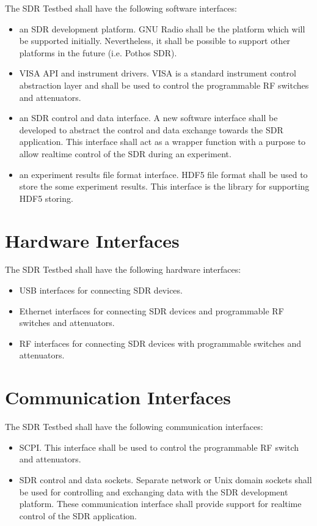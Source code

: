 \documentclass[english,titlepage,a4paper]{report}
\begin{document}
The SDR Testbed shall have the following software interfaces:
\begin{itemize}
\item an SDR development platform.
  GNU Radio shall be the platform which will be supported initially.
  Nevertheless, it shall be possible to support other platforms in the future (i.e. Pothos SDR).
\item VISA API and instrument drivers.
  VISA is a standard instrument control abstraction layer and shall be used to control the programmable RF switches and attenuators.
\item an SDR control and data interface.
  A new software interface shall be developed to abstract the control and data exchange towards the SDR application.
  This interface shall act as a wrapper function with a purpose to allow realtime control of the SDR during an experiment.
\item an experiment results file format interface.
  HDF5 file format shall be used to store the some experiment results.
  This interface is the library for supporting HDF5 storing.
\end{itemize}

\section{Hardware Interfaces}

The SDR Testbed shall have the following hardware interfaces:
\begin{itemize}
\item USB interfaces for connecting SDR devices.
\item Ethernet interfaces for connecting SDR devices and programmable RF switches and attenuators.
\item RF interfaces for connecting SDR devices with programmable switches and attenuators.
\end{itemize}

\section{Communication Interfaces}

The SDR Testbed shall have the following communication interfaces:
\begin{itemize}
\item SCPI.
  This interface shall be used to control the programmable RF switch and attenuators.
\item SDR control and data sockets.
  Separate network or Unix domain sockets shall be used for controlling and exchanging data with the SDR development platform.
  These communication interface shall provide support for realtime control of the SDR application.
\end{itemize}
\end{document}
